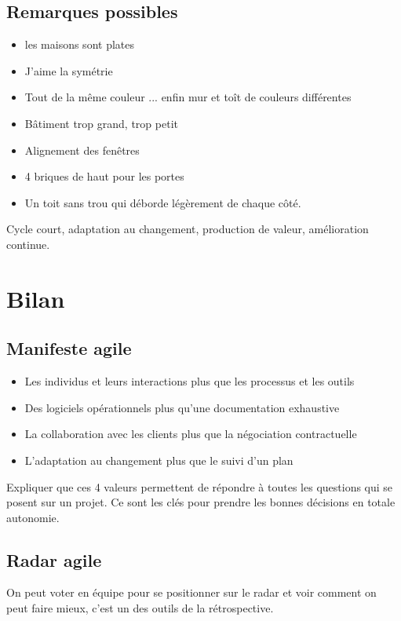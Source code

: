 \documentclass[a4paper,12pt]{article}
\begin{document}
\subsection{Remarques possibles}
\begin{itemize}
  \item les maisons sont plates
  \item J'aime la symétrie
  \item Tout de la même couleur ... enfin mur et toît de couleurs différentes
  \item Bâtiment trop grand, trop petit
  \item Alignement des fenêtres
  \item 4 briques de haut pour les portes
  \item Un toit sans trou qui déborde légèrement de chaque côté.
\end{itemize}

Cycle court, adaptation au changement, production de valeur, amélioration continue.

\section{Bilan}
\subsection{Manifeste agile}
\begin{itemize}
  \item Les individus et leurs interactions plus que les processus et les outils
  \item Des logiciels opérationnels plus qu’une documentation exhaustive
  \item La collaboration avec les clients plus que la négociation contractuelle
  \item L’adaptation au changement plus que le suivi d’un plan
\end{itemize}

Expliquer que ces 4 valeurs permettent de répondre à toutes les questions qui se posent sur un projet. Ce sont les clés pour prendre les bonnes décisions en totale autonomie.

\subsection{Radar agile}
On peut voter en équipe pour se positionner sur le radar et voir comment on peut faire mieux, c'est un des outils de la rétrospective.
\end{document}

